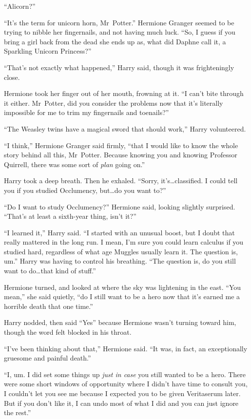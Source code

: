 “Alicorn?”

“It’s the term for unicorn horn, Mr~Potter.” Hermione Granger seemed to be trying to nibble her fingernails, and not having much luck. “So, I guess if you bring a girl back from the dead she ends up as, what did Daphne call it, a Sparkling Unicorn Princess?”

“That’s not exactly what happened,” Harry said, though it was frighteningly close.

Hermione took her finger out of her mouth, frowning at it. “I can’t bite through it either. Mr~Potter, did you consider the problems now that it’s literally impossible for me to trim my fingernails and toenails?”

“The Weasley twins have a magical sword that should work,” Harry volunteered.

“I think,” Hermione Granger said firmly, “that I would like to know the whole story behind all this, Mr~Potter. Because knowing you and knowing Professor Quirrell, there was some sort of \emph{plan} going on.”

Harry took a deep breath. Then he exhaled. “Sorry, it’s…classified. I could tell you if you studied Occlumency, but…do you want to?”

“Do I want to study Occlumency?” Hermione said, looking slightly surprised. “That’s at least a sixth-year thing, isn’t it?”

“I learned it,” Harry said. “I started with an unusual boost, but I doubt that really mattered in the long run. I mean, I’m sure you could learn calculus if you studied hard, regardless of what age Muggles usually learn it. The question is, um.” Harry was having to control his breathing. “The question is, do you still want to do…that kind of stuff.”

Hermione turned, and looked at where the sky was lightening in the east. “You mean,” she said quietly, “do I still want to be a hero now that it’s earned me a horrible death that one time.”

Harry nodded, then said “Yes” because Hermione wasn’t turning toward him, though the word felt blocked in his throat.

“I’ve been thinking about that,” Hermione said. “It was, in fact, an exceptionally gruesome and painful death.”

“I, um. I did set some things up \emph{just in case} you still wanted to be a hero. There were some short windows of opportunity where I didn’t have time to consult you, I couldn’t let you see me because I expected you to be given Veritaserum later. But if you don’t like it, I can undo most of what I did and you can just ignore the rest.”

